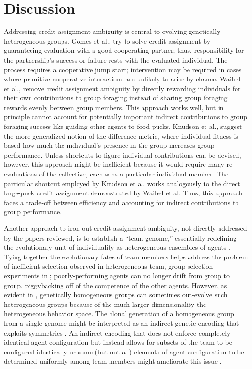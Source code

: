 \section{Discussion}

Addressing credit assignment ambiguity is central to evolving genetically heterogeneous groups.
Gomes et al., try to solve credit assignment by guaranteeing evaluation with a good cooperating partner;
thus, responsibility for the partnership's success or failure rests with the evaluated individual.
The process requires a cooperative jump start; intervention may be required in cases where primitive cooperative interactions are unlikely to arise by chance.
Waibel et al., remove credit assignment ambiguity by directly rewarding individuals for their own contributions to group foraging instead of sharing group foraging rewards evenly between group members.
This approach works well, but in principle cannot account for potentially important indirect contributions to group foraging success like guiding other agents to food pucks.
Knudson et al., suggest the more generalized notion of the difference metric, where individual fitness is based how much the individual's presence in the group increases group performance.
Unless shortcuts to figure individual contributions can be devised, however, this approach might be inefficient because it would require many re-evaluations of the collective, each sans a particular individual member.
The particular shortcut employed by Knudson et al. works analogously to the direct large-puck credit assignment demonstrated by Waibel et al.
Thus, this approach faces a trade-off between efficiency and accounting for indirect contributions to group performance.

Another approach to iron out credit-assignment ambiguity, not directly addressed by the papers reviewed, is to establish a ``team genome,'' essentially redefining the evolutionary unit of individuality as heterogeneous ensembles of agents \cite{miconi2003evolving}.
Tying together the evolutionary fates of team members helps address the problem of inefficient selection observed in heterogeneous-team, group-selection experiments in \cite{waibel2009genetic};
poorly-performing agents can no longer drift from group to group, piggybacking off of the competence of the other agents.
However, as evident in \cite{waibel2009genetic}, genetically homogeneous groups can sometimes out-evolve such heterogeneous groups because of the much larger dimensionality the heterogeneous behavior space.
The clonal generation of a homogeneous group from a single genome might be interpreted as an indirect genetic encoding that exploits symmetries \cite{clune2011performance}.
An indirect encoding that does not enforce completely identical agent configuration but instead allows for subsets of the team to be configured identically or some (but not all) elements of agent configuration to be determined uniformly among team members might ameliorate this issue \cite{bongard2000legion}.

